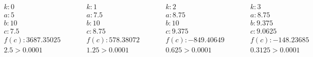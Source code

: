 \documentclass[letterpaper, 11pt]{extarticle}
\begin{document}
\begin{align*}
    \begin{aligned}
        & k: 0 \\
        & a: 5 \\
        & b: 10 \\
        & c: 7.5 \\
        & f(c): 3687.35025 \\
        & 2.5 > 0.0001
    \end{aligned}
    \qquad
    \begin{aligned}
        & k: 1 \\
        & a: 7.5 \\
        & b: 10 \\
        & c: 8.75 \\
        & f(c): 578.38072 \\
        & 1.25 > 0.0001
    \end{aligned}
    \qquad
    \begin{aligned}
        & k: 2 \\
        & a: 8.75 \\
        & b: 10 \\
        & c: 9.375 \\
        & f(c): -849.40649 \\
        & 0.625 > 0.0001
    \end{aligned}
    \qquad
    \begin{aligned}
        & k: 3 \\
        & a: 8.75 \\
        & b: 9.375 \\
        & c: 9.0625 \\
        & f(c): -148.23685 \\
        & 0.3125 > 0.0001
    \end{aligned}
\end{align*}

\vspace{-5pt}
\end{document}
